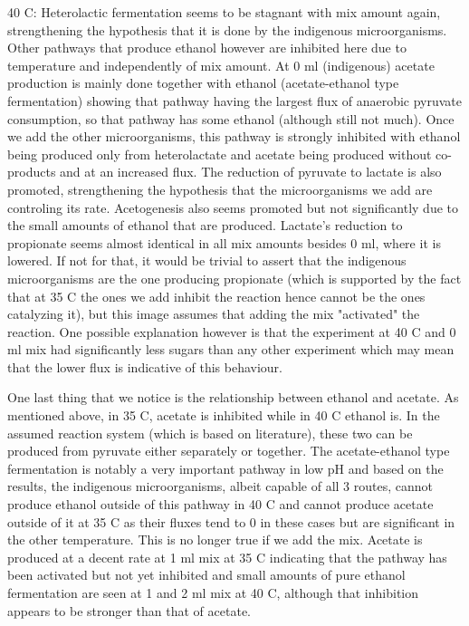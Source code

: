 \documentclass[11pt]{article}
\begin{document}
40 C: Heterolactic fermentation seems to be stagnant with mix amount again, strengthening the hypothesis that it is done by the indigenous microorganisms. Other pathways that produce ethanol however are inhibited here due to temperature and independently of mix amount. At 0 ml (indigenous) acetate production is mainly done together with ethanol (acetate-ethanol type fermentation) showing that pathway having the largest flux of anaerobic pyruvate consumption, so that pathway has some ethanol (although still not much). Once we add the other microorganisms, this pathway is strongly inhibited with ethanol being produced only from heterolactate and acetate being produced without co-products and at an increased flux. The reduction of pyruvate to lactate is also promoted, strengthening the hypothesis that the microorganisms we add are controling its rate. Acetogenesis also seems promoted but not significantly due to the small amounts of ethanol that are produced. Lactate's reduction to propionate seems almost identical in all mix amounts besides 0 ml, where it is lowered. If not for that, it would be trivial to assert that the indigenous microorganisms are the one producing propionate (which is supported by the fact that at 35 C the ones we add inhibit the reaction hence cannot be the ones catalyzing it), but this image assumes that adding the mix "activated" the reaction. One possible explanation however is that the experiment at 40 C and 0 ml mix had significantly less sugars than any other experiment which may mean that the lower flux is indicative of this behaviour.

One last thing that we notice is the relationship between ethanol and acetate. As mentioned above, in 35 C, acetate is inhibited while in 40 C ethanol is. In the assumed reaction system (which is based on literature), these two can be produced from pyruvate either separately or together. The acetate-ethanol type fermentation is notably a very important pathway in low pH and based on the results, the indigenous microorganisms, albeit capable of all 3 routes, cannot produce ethanol outside of this pathway in 40 C and cannot produce acetate outside of it at 35 C as their fluxes tend to 0 in these cases but are significant in the other temperature. This is no longer true if we add the mix. Acetate is produced at a decent rate at 1 ml mix at 35 C indicating that the pathway has been activated but not yet inhibited and small amounts of pure ethanol fermentation are seen at 1 and 2 ml mix at 40 C, although that inhibition appears to be stronger than that of acetate.
\end{document}
